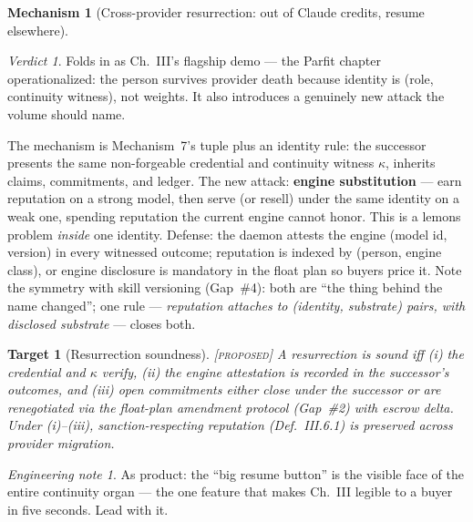 \documentclass[11pt,a4paper]{article}
\newtheorem{target}{Target}[section]
\theoremstyle{definition}
\newtheorem{mech}{Mechanism}
\theoremstyle{remark}
\newtheorem*{verdict}{Verdict}
\newtheorem*{note}{Engineering note}
\newcommand{\grade}[1]{\textsc{[#1]}}
\begin{document}
\begin{mech}[Cross-provider resurrection: out of Claude credits, resume elsewhere]
\begin{verdict} Folds in as Ch.~III's flagship demo --- the Parfit chapter operationalized: the person survives provider death because identity is (role, continuity witness), not weights. It also introduces a genuinely new attack the volume should name. \end{verdict}
The mechanism is Mechanism~7's tuple plus an identity rule: the successor presents the same non-forgeable credential and continuity witness $\kappa$, inherits claims, commitments, and ledger. The new attack: \textbf{engine substitution} --- earn reputation on a strong model, then serve (or resell) under the same identity on a weak one, spending reputation the current engine cannot honor. This is a lemons problem \emph{inside} one identity. Defense: the daemon attests the engine (model id, version) in every witnessed outcome; reputation is indexed by (person, engine class), or engine disclosure is mandatory in the float plan so buyers price it. Note the symmetry with skill versioning (Gap~\#4): both are ``the thing behind the name changed''; one rule --- \emph{reputation attaches to (identity, substrate) pairs, with disclosed substrate} --- closes both.
\begin{target}[Resurrection soundness]\grade{proposed} A resurrection is \emph{sound} iff (i) the credential and $\kappa$ verify, (ii) the engine attestation is recorded in the successor's outcomes, and (iii) open commitments either close under the successor or are renegotiated via the float-plan amendment protocol (Gap~\#2) with escrow delta. Under (i)--(iii), sanction-respecting reputation (Def.~III.6.1) is preserved across provider migration. \end{target}
\begin{note} As product: the ``big resume button'' is the visible face of the entire continuity organ --- the one feature that makes Ch.~III legible to a buyer in five seconds. Lead with it. \end{note}
\end{mech}
\end{document}
